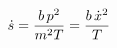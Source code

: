 \documentclass[preview]{standalone}
\begin{document}
\begin{align*}
\special{dvisvgm:raw <g id='unique000'>}\dot s=\frac{b\,p^2}{m^2T}=\frac{b\,\dot x^2}{T}\special{dvisvgm:raw </g>}
\end{align*}
\end{document}

